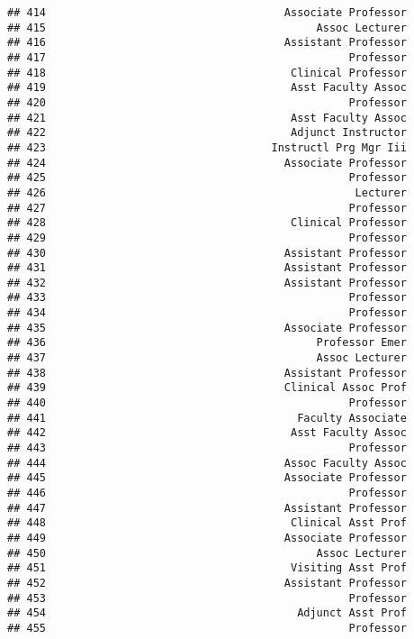 \documentclass[
]{article}
\begin{document}
\begin{verbatim}
## 414                                     Associate Professor
## 415                                          Assoc Lecturer
## 416                                     Assistant Professor
## 417                                               Professor
## 418                                      Clinical Professor
## 419                                      Asst Faculty Assoc
## 420                                               Professor
## 421                                      Asst Faculty Assoc
## 422                                      Adjunct Instructor
## 423                                   Instructl Prg Mgr Iii
## 424                                     Associate Professor
## 425                                               Professor
## 426                                                Lecturer
## 427                                               Professor
## 428                                      Clinical Professor
## 429                                               Professor
## 430                                     Assistant Professor
## 431                                     Assistant Professor
## 432                                     Assistant Professor
## 433                                               Professor
## 434                                               Professor
## 435                                     Associate Professor
## 436                                          Professor Emer
## 437                                          Assoc Lecturer
## 438                                     Assistant Professor
## 439                                     Clinical Assoc Prof
## 440                                               Professor
## 441                                       Faculty Associate
## 442                                      Asst Faculty Assoc
## 443                                               Professor
## 444                                     Assoc Faculty Assoc
## 445                                     Associate Professor
## 446                                               Professor
## 447                                     Assistant Professor
## 448                                      Clinical Asst Prof
## 449                                     Associate Professor
## 450                                          Assoc Lecturer
## 451                                      Visiting Asst Prof
## 452                                     Assistant Professor
## 453                                               Professor
## 454                                       Adjunct Asst Prof
## 455                                               Professor

\end{verbatim}
\end{document}
